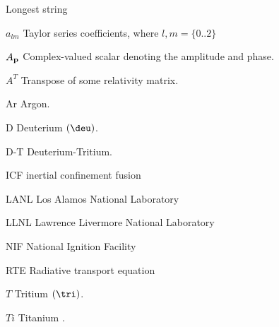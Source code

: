 \begin{glossary}{Longest  string}
   \item[$a_{lm}$]
      Taylor series coefficients, where $l,m = \{0..2\}$
   \item[$A_{\bf{p}}$]
      Complex-valued scalar denoting the amplitude and phase.
   \item[$A^T$]
      Transpose of some relativity matrix.
%
   \item[Ar]
      Argon.
%
   \item[D]
      Deuterium $(\deu)$.
   \item[D-T]
      Deuterium-Tritium.
%
  \item[ICF]
     inertial confinement fusion
%
  \item[LANL]
     Los Alamos National Laboratory
  \item[LLNL]
     Lawrence Livermore National Laboratory
%
  \item[NIF]
     National Ignition Facility
%
  \item[RTE]
     Radiative transport equation
%
   \item[$T$]
      Tritium $(\tri)$.
%
   \item[$Ti$]
      Titanium .

%
\end{glossary}
\endinput %